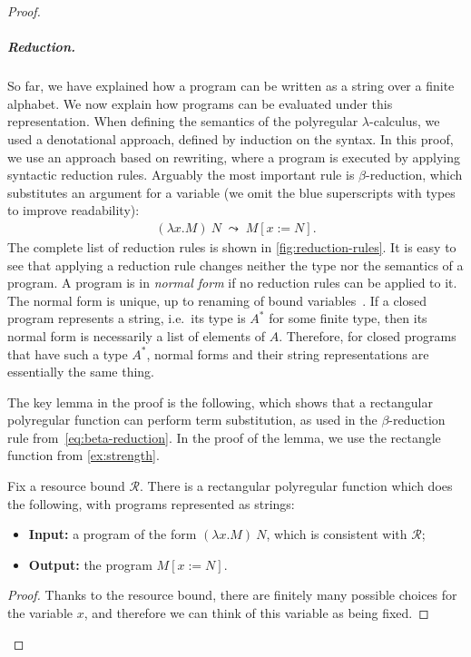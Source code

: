 \documentclass[a4paper,UKenglish,cleveref, autoref, thm-restate]{lipics-v2021}
\newcommand{\Rr}{{\mathcal R}}
\begin{document}
\begin{proof}
  \subparagraph{Reduction.} So far, we have explained how a program can be written as a string over a finite alphabet. We now explain how programs can be evaluated under this representation. 
    When defining the semantics of the polyregular $\lambda$-calculus, we used a denotational approach, defined by  induction on the syntax. In this proof, we use an approach based on rewriting, where  a program is executed by applying syntactic reduction rules. Arguably the most important rule is $\beta$-reduction, which  substitutes an argument for a variable (we omit the blue superscripts with types to improve readability): 
    \begin{align}\label{eq:beta-reduction}
    (\lambda x. M)\ N \; \leadsto \; M[x:=N].
    \end{align}
The complete list of reduction rules is shown in \cref{fig:reduction-rules}.
It is easy to see that applying a reduction rule changes neither the type nor the semantics of a program.  A program is in \emph{normal form} if no reduction rules can be applied to it. The normal form is unique, up to renaming of bound variables~\cite[Corollary 1.4.9]{sorensenLecturesCurryHowardIsomorphism2006}. If a closed program represents a string, i.e.~its type is $A^*$ for some finite type, then its normal form is necessarily a list of elements of $A$. Therefore, for closed programs that have such a type $A^*$, normal forms and their string representations are essentially the same thing.

    The key lemma in the proof is the following, which shows that a rectangular polyregular function can perform term  substitution, as used in the $\beta$-reduction rule from~\eqref{eq:beta-reduction}. In the proof of the lemma, we use the rectangle function from \cref{ex:strength}. 
    \begin{lemma}\label{lem:substitution}
        Fix a resource bound $\Rr$. There is a rectangular polyregular function which does the following, with programs represented as strings:
        \begin{itemize}
            \item \textbf{Input:} a program of the form $(\lambda x. M) \ N$, which is consistent with $\Rr$; 
            \item \textbf{Output:} the program $M[x:=N]$.
        \end{itemize}
    \end{lemma}
    \begin{proof}Thanks to the resource bound, there are finitely many possible choices for the variable $x$, and therefore we can think of this variable as being fixed. 


\end{proof}
\end{proof}
\end{document}

